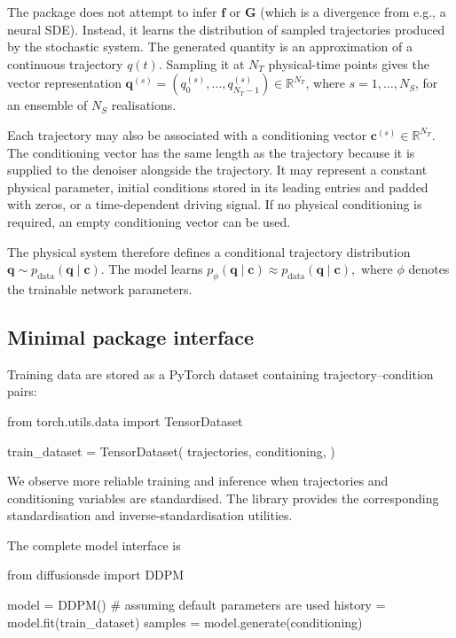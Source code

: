 The package does not attempt to infer $\mathbf{f}$ or $\mathbf{G}$ (which is a divergence from e.g., a neural SDE). Instead, it learns the distribution of sampled trajectories produced by the stochastic system. The generated quantity is an approximation of a continuous trajectory $q(t)$. Sampling it at $N_T$ physical-time points gives the vector representation $\mathbf{q}^{(s)} = \left( q^{(s)}_0,\ldots,q^{(s)}_{N_T-1} \right) \in\mathbb{R}^{N_T}$, where $s=1,\ldots,N_S$, for an ensemble of $N_S$ realisations.

Each trajectory may also be associated with a conditioning vector $\mathbf{c}^{(s)}\in\mathbb{R}^{N_T}.$ The conditioning vector has the same length as the trajectory because it is supplied to the denoiser alongside the trajectory. It may represent a constant physical parameter, initial conditions stored in its leading entries and padded with zeros, or a time-dependent driving signal. If no physical conditioning is required, an empty conditioning vector can be used.

The physical system therefore defines a conditional trajectory distribution $\mathbf{q}\sim p_{\mathrm{data}}(\mathbf{q}\mid\mathbf{c}).$ The model learns $p_\phi(\mathbf{q}\mid\mathbf{c}) \approx p_{\mathrm{data}}(\mathbf{q}\mid\mathbf{c}),$ where $\phi$ denotes the trainable network parameters.

\subsection{Minimal package interface}
Training data are stored as a PyTorch dataset containing trajectory--condition pairs:

\begin{pythonlisting}
from torch.utils.data import TensorDataset

train_dataset = TensorDataset(
    trajectories,
    conditioning,
)
\end{pythonlisting}

We observe more reliable training and inference when trajectories and conditioning variables are standardised. The library provides the corresponding standardisation and inverse-standardisation utilities.

The complete model interface is

\begin{pythonlisting}
from diffusionsde import DDPM

model = DDPM() # assuming default parameters are used
history = model.fit(train_dataset)
samples = model.generate(conditioning)
\end{pythonlisting}

